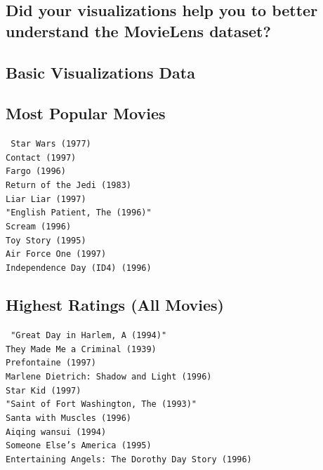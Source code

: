 \subsection*{Did your visualizations help you to better understand the MovieLens dataset?}

\pagebreak
\begin{appendices}

\section{Basic Visualizations Data}

\subsection{Most Popular Movies}
\label{appendix:popular}
\texttt{%
  Star Wars (1977) \\
  Contact (1997) \\
  Fargo (1996) \\
  Return of the Jedi (1983) \\
  Liar Liar (1997) \\
  "English Patient, The (1996)" \\
  Scream (1996) \\
  Toy Story (1995) \\
  Air Force One (1997) \\
  Independence Day (ID4)  (1996)
}

\subsection{Highest Ratings (All Movies)}
\label{appendix:highest}
\texttt{%
  "Great Day in Harlem, A (1994)" \\
  They Made Me a Criminal (1939) \\
  Prefontaine (1997) \\
  Marlene Dietrich: Shadow and Light (1996) \\
  Star Kid (1997) \\
  "Saint of Fort Washington, The (1993)" \\
  Santa with Muscles (1996) \\
  Aiqing wansui (1994) \\
  Someone Else's America (1995) \\
  Entertaining Angels: The Dorothy Day Story (1996)
}


\end{appendices}
